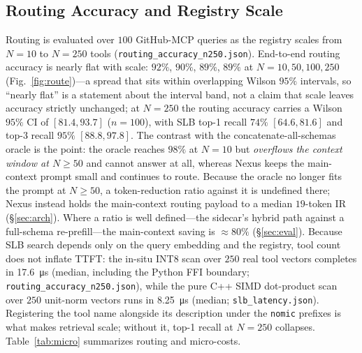 \documentclass[10pt,conference]{IEEEtran}
\newcommand{\code}[1]{\texttt{\small #1}}
\begin{document}
\subsection{Routing Accuracy and Registry Scale}
Routing is evaluated over $100$ GitHub-MCP queries as the registry scales from $N=10$ to $N=250$
tools (\code{routing\_accuracy\_n250.json}). End-to-end routing accuracy is nearly flat with scale:
$92\%$, $90\%$, $89\%$, $89\%$ at $N=10,50,100,250$ (Fig.~\ref{fig:route})---a spread that sits
within overlapping Wilson $95\%$ intervals, so ``nearly flat'' is a statement about the interval
band, not a claim that scale leaves accuracy strictly unchanged; at $N=250$ the routing
accuracy carries a Wilson $95\%$ CI of $[81.4, 93.7]$ ($n{=}100$), with SLB top-1 recall
$74\%$ $[64.6, 81.6]$ and top-3 recall $95\%$ $[88.8, 97.8]$. The contrast with the
concatenate-all-schemas oracle is
the point: the oracle reaches $98\%$ at $N=10$ but \emph{overflows the context window at $N\ge50$}
and cannot answer at all, whereas Nexus keeps the main-context prompt small and continues to route.
Because the oracle no longer fits the prompt at $N\ge50$, a token-reduction ratio against it is
undefined there; Nexus instead holds the main-context routing payload to a median $19$-token IR
(\S\ref{sec:arch}). Where a ratio is well defined---the sidecar's hybrid path against a
full-schema re-prefill---the main-context saving is ${\approx}80\%$ (\S\ref{sec:eval}). Because SLB search depends only on the query
embedding and the registry, tool count does not inflate TTFT: the in-situ INT8 scan over $250$ real
tool vectors completes in \SI{17.6}{\micro\second} (median, including the Python FFI boundary;
\code{routing\_accuracy\_n250.json}), while the pure C++ SIMD dot-product scan over $250$ unit-norm
vectors runs in \SI{8.25}{\micro\second} (median; \code{slb\_latency.json}). Registering the tool
name alongside its
description under the \code{nomic} prefixes is what makes retrieval scale; without it, top-1 recall at
$N=250$ collapses. Table~\ref{tab:micro} summarizes routing and micro-costs.
\end{document}
